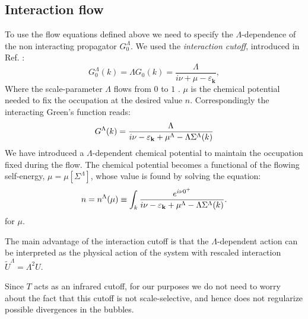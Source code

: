 \subsection{Interaction flow}
\label{sec:IntFlow}
To use the flow equations defined above we need to specify the $\Lambda$-dependence of the non interacting propagator $G_0^\Lambda$.
We used the \textit{interaction cutoff}, introduced in Ref. :
 \begin{equation}
 G_0^\Lambda(k) = \Lambda G_0(k)=\frac{\Lambda}{i\nu+\mu-\varepsilon_{\mathbf{k}} } , 
 \end{equation}
  Where the scale-parameter $\Lambda$ flows from $0$ to $1$%
. $\mu$ is the chemical potential needed to fix the occupation at the desired value $n$. Correspondingly the interacting Green's function reads: 
\begin{equation}
G^\Lambda (k) = \frac{\Lambda}{i\nu - \varepsilon_{\mathbf{k}} +\mu^{\Lambda}-\Lambda\Sigma^\Lambda(k)} 
\end{equation} 
We have introduced a $\Lambda$-dependent chemical potential to maintain the occupation fixed during the flow. The chemical potential becomes a functional of the flowing self-energy, $\mu=\mu[\Sigma^\Lambda]$, whose value is found by solving the equation:  
\begin{equation}
n = n^{\Lambda}(\mu) \equiv \int_k \frac{e^{i\nu 0^{+}}} {i\nu - \varepsilon_{\mathbf{k}} +\mu^{\Lambda}-\Lambda\Sigma^\Lambda(k)}. 
\end{equation} 
for $\mu$.  

The main advantage of the interaction cutoff is that  the $\Lambda$-dependent action can be interpreted\cite{Honerkamp2004} as the physical action of the system with rescaled interaction $\tilde{U}^\Lambda = \Lambda^2 U$.

Since $T$ acts as an infrared cutoff, for our purposes we do not need to worry about the fact that this cutoff is not scale-selective, and hence does not regularize possible divergences in the bubbles. 

